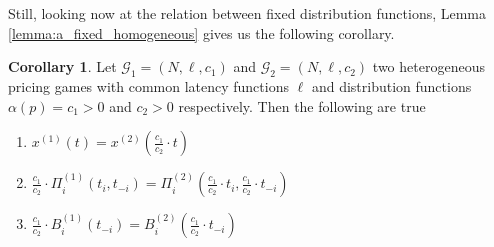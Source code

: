 \documentclass[10pt,a4paper]{book}
\newcommand{\Gm}{\mathcal{G}}
\theoremstyle{definition}
\newtheorem{corollary}[definition]{Corollary}
\theoremstyle{comment}
\begin{document}
Still, looking now at the relation between fixed distribution functions, Lemma \ref{lemma:a_fixed_homogeneous} gives us the following corollary.
\begin{corollary}
	\label{corollary:a_fixed_c_relation}
	Let $\Gm_1 = (N, \ell, c_1)$ and $\Gm_2 = (N, \ell, c_2)$ two heterogeneous pricing games with common latency functions $\ell$ and distribution functions $\alpha(p) = c_1 > 0$ and $c_2 > 0$ respectively.
	Then the following are true
	\begin{enumerate}[$(i)$]
		\item $x^{(1)}(t) = x^{(2)}\left(\frac{c_1}{c_2} \cdot t\right)$
		\item $\frac{c_1}{c_2} \cdot \Pi_i^{(1)}(t_i, t_{-i}) = \Pi_i^{(2)}\left(\frac{c_1}{c_2} \cdot t_i, \frac{c_1}{c_2} \cdot t_{-i}\right)$
		\item $\frac{c_1}{c_2} \cdot B_i^{(1)}(t_{-i}) = B_i^{(2)}\left(\frac{c_1}{c_2} \cdot t_{-i}\right)$
	\end{enumerate}
\end{corollary}
\end{document}
